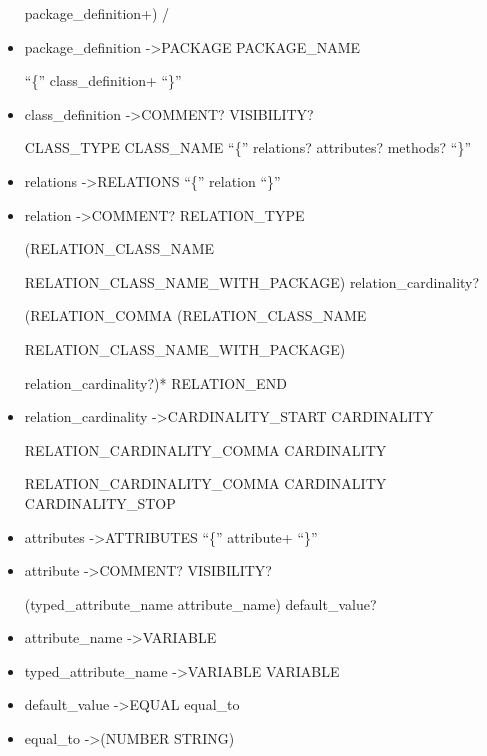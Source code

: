 \begin{itemize}
   \textbar   package{\_}definition+)  /

 \item package{\_}definition   -\textgreater   PACKAGE  PACKAGE{\_}NAME  
 
 ``\{''  class{\_}definition+  ``\}''

 \item class{\_}definition   -\textgreater   COMMENT?  VISIBILITY?  
 
 CLASS{\_}TYPE  CLASS{\_}NAME  ``\{'' relations?  attributes?  methods?  ``\}''

 \item relations   -\textgreater   RELATIONS  ``\{''  relation  ``\}''

 \item relation   -\textgreater   COMMENT?  RELATION{\_}TYPE  
 
 (RELATION{\_}CLASS{\_}NAME 
 
 \textbar RELATION{\_}CLASS{\_}NAME{\_}WITH{\_}PACKAGE)  relation{\_}cardinality?  
 
 (RELATION{\_}COMMA  (RELATION{\_}CLASS{\_}NAME 
 
 \textbar RELATION{\_}CLASS{\_}NAME{\_}WITH{\_}PACKAGE)  
 
 relation{\_}cardinality?)*  RELATION{\_}END

 \item relation{\_}cardinality   -\textgreater   CARDINALITY{\_}START  CARDINALITY  
 
 RELATION{\_}CARDINALITY{\_}COMMA   CARDINALITY 
 
 RELATION{\_}CARDINALITY{\_}COMMA  CARDINALITY  CARDINALITY{\_}STOP

 \item attributes   -\textgreater   ATTRIBUTES  ``\{''  attribute+  ``\}''

 \item attribute   -\textgreater   COMMENT?  VISIBILITY?  
 
 (typed{\_}attribute{\_}name \textbar attribute{\_}name)  default{\_}value?

 \item attribute{\_}name   -\textgreater   VARIABLE

 \item typed{\_}attribute{\_}name   -\textgreater   VARIABLE  VARIABLE

 \item default{\_}value   -\textgreater   EQUAL  equal{\_}to

 \item equal{\_}to   -\textgreater   (NUMBER \textbar STRING)


\end{itemize}
